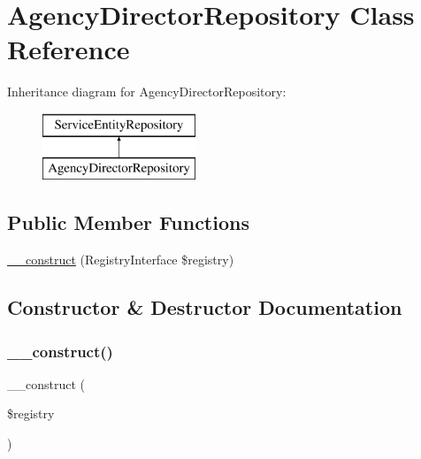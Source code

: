 \hypertarget{class_app_1_1_repository_1_1_agency_director_repository}{}\section{Agency\+Director\+Repository Class Reference}
\label{class_app_1_1_repository_1_1_agency_director_repository}
Inheritance diagram for Agency\+Director\+Repository\+:\begin{figure}[H]
\begin{center}
\leavevmode
\includegraphics[height=2.000000cm]{class_app_1_1_repository_1_1_agency_director_repository}
\end{center}
\end{figure}
\subsection*{Public Member Functions}
\begin{DoxyCompactItemize}
\item 
\mbox{\hyperlink{class_app_1_1_repository_1_1_agency_director_repository_aadca7edd263e228921a1860bb6b9c252}{\+\_\+\+\_\+construct}} (Registry\+Interface \$registry)
\end{DoxyCompactItemize}


\subsection{Constructor \& Destructor Documentation}
\mbox{\label{class_app_1_1_repository_1_1_agency_director_repository_aadca7edd263e228921a1860bb6b9c252}} 
\subsubsection{\texorpdfstring{\_\_construct()}{\_\_construct()}}
{\footnotesize\ttfamily \+\_\+\+\_\+construct (\begin{DoxyParamCaption}\item[{Registry\+Interface}]{\$registry }\end{DoxyParamCaption})}

